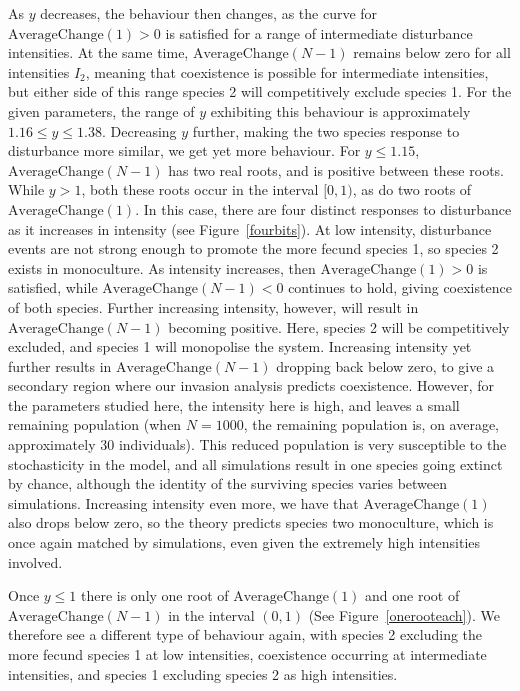 \documentclass[preprint,10pt,reqno]{amsart}
\begin{document}
As $y$ decreases, the behaviour then changes, as the curve for $\text{AverageChange}(1)>0$ is satisfied for a range of intermediate disturbance intensities. At the same time, $\text{AverageChange}(N-1)$ remains below zero for all intensities $I_2$, meaning that coexistence is possible for intermediate intensities, but either side of this range species 2 will competitively exclude species 1. For the given parameters, the range of $y$ exhibiting this behaviour is approximately $1.16 \leq y \leq 1.38$. Decreasing $y$ further, making the two species response to disturbance more similar, we get yet more behaviour. For $y\leq 1.15$, $\text{AverageChange}(N-1)$ has two real roots, and is positive between these roots. While $y>1$, both these roots occur in the interval $[0,1)$, as do two roots of $\text{AverageChange}(1)$. In this case, there are four distinct responses to disturbance as it increases in intensity (see Figure~\ref{fourbits}). At low intensity, disturbance events are not strong enough to promote the more fecund species 1, so species 2 exists in monoculture. As intensity increases, then $\text{AverageChange}(1)>0$ is satisfied, while $\text{AverageChange}(N-1)<0$ continues to hold, giving coexistence of both species. Further increasing intensity, however, will result in $\text{AverageChange}(N-1)$ becoming positive. Here, species 2 will be competitively excluded, and species 1 will monopolise the system. Increasing intensity yet further results in $\text{AverageChange}(N-1)$ dropping back below zero, to give a secondary region where our invasion analysis predicts coexistence. However, for the parameters studied here, the intensity here is high, and leaves a small remaining population (when $N=1000$, the remaining population is, on average, approximately 30 individuals). This reduced population is very susceptible to the stochasticity in the model, and all simulations result in one species going extinct by chance, although the identity of the surviving species varies between simulations. Increasing intensity even more, we have that $\text{AverageChange}(1)$ also drops below zero, so the theory predicts species two monoculture, which is once again matched by simulations, even given the extremely high intensities involved.

Once $y\leq 1$ there is only one root of $\text{AverageChange}(1)$ and one root of $\text{AverageChange}(N-1)$ in the interval $(0,1)$ (See Figure~\ref{onerooteach}). We therefore see a different type of behaviour again, with species 2 excluding the more fecund species 1 at low intensities, coexistence occurring at intermediate intensities, and species 1 excluding species 2 as high intensities.
\end{document}

